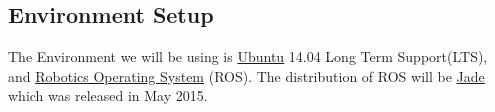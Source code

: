 
\subsection{Environment Setup}
The Environment we will be using is \href{http://www.ubuntu.com/download/desktop}{Ubuntu} 14.04 Long Term Support(LTS), and \href{http://www.ros.org/}{Robotics Operating System} (ROS). The distribution of ROS will be \href{http://wiki.ros.org/jade}{Jade} which was released in May 2015.


